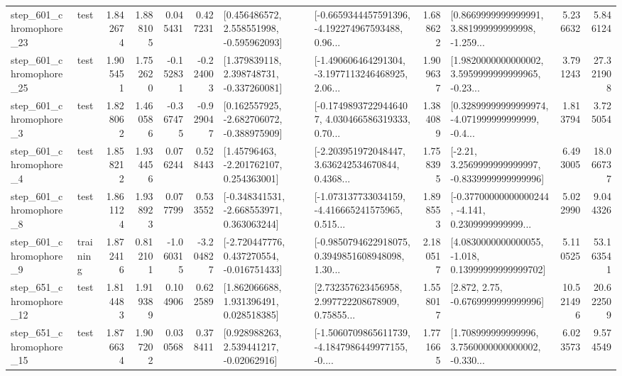 \begin{tabular}{llrrrrllrlrr}
  step\_601\_chromophore\_23 &      test &      1.842674 &    1.888105 &      0.045431 &  0.427231 &    [0.456486572, 2.558551998, -0.595962093] &  [-0.6659344457591396, -4.192274967593488, 0.96... &       1.688622 &  [0.8669999999999991, 3.881999999999998, -1.259... &            5.236632 &          5.846124 \\
  step\_601\_chromophore\_25 &      test &      1.905451 &    1.752620 &     -0.152831 & -0.224003 &    [1.379839118, 2.398748731, -0.337260081] &  [-1.490606464291304, -3.1977113246468925, 2.06... &       1.909637 &  [1.9820000000000002, 3.5959999999999965, -0.23... &            3.791243 &         27.321908 \\
   step\_601\_chromophore\_3 &      test &      1.828062 &    1.460586 &     -0.367475 & -0.929047 &   [0.162557925, -2.682706072, -0.388975909] &  [-0.17498937229446407, 4.030466586319333, 0.70... &       1.384089 &  [0.32899999999999974, -4.071999999999999, -0.4... &            1.813794 &          3.725054 \\
   step\_601\_chromophore\_4 &      test &      1.858212 &    1.934456 &      0.076244 &  0.528443 &     [1.45796463, -2.201762107, 0.254363001] &  [-2.203951972048447, 3.636242534670844, 0.4368... &       1.758395 &   [-2.21, 3.2569999999999997, -0.8339999999999996] &            6.493005 &         18.066737 \\
   step\_601\_chromophore\_8 &      test &      1.861124 &    1.938923 &      0.077799 &  0.533552 &   [-0.348341531, -2.668553971, 0.363063244] &  [-1.073137733034159, -4.416665241575965, 0.515... &       1.898553 &  [-0.37700000000000244, -4.141, 0.2309999999999... &            5.022990 &          9.044326 \\
   step\_601\_chromophore\_9 &  training &      1.872416 &    0.812101 &     -1.060315 & -3.204827 &   [-2.720447776, 0.437270554, -0.016751433] &  [-0.9850794622918075, 0.3949851608948098, 1.30... &       2.180517 &  [4.0830000000000055, -1.018, 0.13999999999999702] &            5.110525 &         53.163541 \\
  step\_651\_chromophore\_12 &      test &      1.814483 &    1.919389 &      0.104906 &  0.622589 &     [1.862066688, 1.931396491, 0.028518385] &  [2.732357623456958, 2.997722208678909, 0.75855... &       1.558017 &                 [2.872, 2.75, -0.6769999999999996] &           10.521496 &         20.622509 \\
  step\_651\_chromophore\_15 &      test &      1.876634 &    1.907202 &      0.030568 &  0.378411 &     [0.928988263, 2.539441217, -0.02062916] &  [-1.5060709865611739, -4.1847986449977155, -0.... &       1.771665 &  [1.708999999999996, 3.7560000000000002, -0.330... &            6.023573 &          9.574549 \\

\end{tabular}
